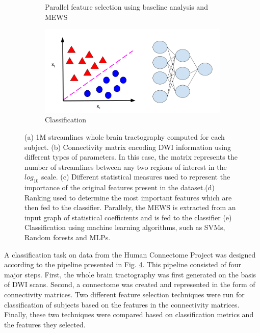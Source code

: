 \documentclass[msthesis.tex]{subfiles}
\begin{document}
\begin{figure}
\begin{subfigure}[b]{0.9\textwidth}
\begin{subfigure}[b]{0.4\textwidth}
         \label{fig:mewspip}
         \end{subfigure}
    \vspace{-2em}
     \caption{Parallel feature selection using baseline analysis and MEWS}
    \end{subfigure}
    \vfill
        \begin{subfigure}[b]{0.6\textwidth}
         \centering
         \includegraphics[height =0.4\textwidth,width=\textwidth]{images/classification.png}
         \caption{Classification}
         \label{fig:three sin x}
         \end{subfigure}
    \caption{(a) 1M streamlines  whole brain tractography computed for each subject. (b) Connectivity matrix encoding DWI information using different types of parameters. In this case, the matrix represents the number of streamlines between any two regions of interest in the $log_{10}$ scale. (c) Different statistical measures used to represent the importance of the original features present in the dataset.(d) Ranking used to determine the  most important features which are then fed to the classifier. Parallely, the MEWS is extracted from an input graph of statistical coefficients and is fed to the classifier (e) Classification using machine learning algorithms, such as SVMs, Random forests and MLPs.}    
    \label{fig:pipeline}
\end{figure}

A classification task  on data from the Human Connectome Project was designed according to the pipeline presented in Fig. \ref{fig:pipeline}.  This pipeline consisted of four major steps. First, the whole brain tractography was first generated on the basis of DWI scans. Second,  a connectome was created and represented in the form of connectivity matrices. Two different feature selection techniques were run for classification of subjects based on the features in the connectivity matrices. Finally, these two techniques were compared based on classification metrics and the features they selected. 
\end{document}
